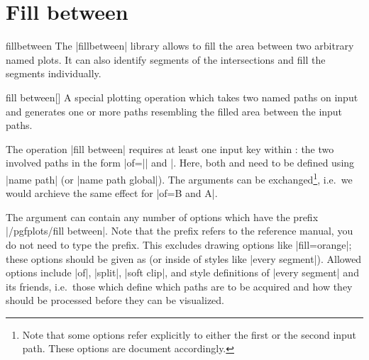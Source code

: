 \section{Fill between}
\begin{pgfplotslibrary}{fillbetween}
	The |fillbetween| library allows to fill the area between two arbitrary named plots.
	It can also identify segments of the intersections and fill the segments individually.
\end{pgfplotslibrary}

\begingroup
{}

\begin{addplotoperation}[]{fill between}{[]}
	A special plotting operation which takes two named paths on input and generates one or more paths resembling the filled area between the input paths.

\begin{codeexample}[]
\end{codeexample}
	The operation |fill between| requires at least one input key within : the two involved paths in the form |of=|| and |. Here, both  and  need to be defined using |name path| (or |name path global|). The arguments can be exchanged\footnote{Note that some options refer explicitly to either the first or the second input path. These options are document accordingly.}, i.e.\ we would archieve the same effect for |of=B and A|.

	The argument  can contain any number of options which have the prefix |/pgfplots/fill between|. Note that the prefix refers to the reference manual, you do not need to type the prefix. This excludes drawing options like |fill=orange|; these options should be given as  (or inside of styles like |every segment|). Allowed options include |of|, |split|, |soft clip|, and style definitions of |every segment| and its friends, i.e.\ those which define which paths are to be acquired and how they should be processed before they can be visualized.


\end{addplotoperation}
